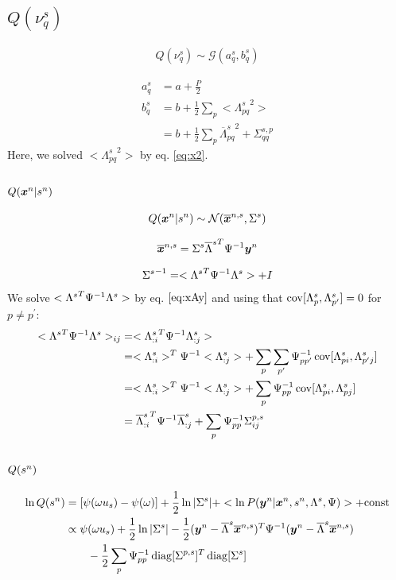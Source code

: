\documentclass[a4paper]{article}
\begin{document}
\subsection{$Q(\nu_q^s)$}
\begin{align}
 Q(\nu_q^s)\sim\mathcal{G}(a_q^s, b_q^s)
\end{align}

\begin{align}
a_q^s&=a+\frac{P}{2} \\
b_q^s&=b+\frac{1}{2}\sum_p<{\Lambda^s_{pq}}^2> \\
&=b+\frac{1}{2}\sum_p {\overline{\Lambda}_{pq}^s}^2+\Sigma_{qq}^{s,p}
\end{align}
Here, we solved $<{\Lambda^s_{pq}}^2>$ by eq. \ref{eq:x2}.

\subsection{$Q(\boldsymbol{x}^n|s^n)$}
\begin{align}
  Q(\boldsymbol{x}^n|s^n)\sim\mathcal{N}(\overline{\boldsymbol{x}}^{n,s},\Sigma^s)
\end{align}

\begin{align}
  \overline{\boldsymbol{x}}^{n,s}=\Sigma^s{\overline{\Lambda}^s}^T\Psi^{-1}\boldsymbol{y}^n
\end{align}

\begin{align}
  {\Sigma^s}^{-1}=<{\Lambda^s}^T \Psi^{-1} \Lambda^s>+I
\end{align}
We solve $<{\Lambda^s}^T \Psi^{-1} \Lambda^s>$ by eq. $\ref{eq:xAy}$ and using that $\operatorname{cov}[\Lambda^s_p,\Lambda^s_{p^\prime}]=0$ for $p\ne p^\prime$:
\begin{align}
  <{\Lambda^s}^T \Psi^{-1} \Lambda^s>_{ij}&=<{\Lambda^s_{:i}}^T \Psi^{-1} \Lambda^s_{:j}> \\
  &=<\Lambda^s_{:i}>^T\Psi^{-1} <\Lambda^s_{:j}>+\sum_p\sum_{p^\prime} \Psi^{-1}_{pp^\prime}\operatorname{cov}[\Lambda^s_{pi},\Lambda^s_{p^\prime j}] \\
  &=<\Lambda^s_{:i}>^T\Psi^{-1} <\Lambda^s_{:j}>+\sum_p \Psi^{-1}_{pp}\operatorname{cov}[\Lambda^s_{pi},\Lambda^s_{pj}] \\
  &={\overline{\Lambda}^s_{:i}}^T\Psi^{-1} \overline{\Lambda}^s_{:j}+\sum_p \Psi^{-1}_{pp}\Sigma^{p,s}_{ij}
\end{align}

\subsection{$Q(s^n)$}
\begin{align}
  \ln Q(s^n)
  &=\left[\psi(\omega u_s)-\psi(\omega)\right]+\frac{1}{2}\ln |\Sigma^s|+<\ln P(\boldsymbol{y}^n|\boldsymbol{x}^n,s^n,\Lambda^s,\Psi)>+\text{const} \\
  &\propto \psi(\omega u_s)+\frac{1}{2}\ln|\Sigma^s|-\frac{1}{2}(\boldsymbol{y}^n-\overline{\Lambda}^s\overline{\boldsymbol{x}}^{n,s})^T\Psi^{-1}(\boldsymbol{y}^n-\overline{\Lambda}^s\overline{\boldsymbol{x}}^{n,s}) \\
  &\qquad-\frac{1}{2}\sum_p \Psi^{-1}_{pp}\operatorname{diag}[\Sigma^{p,s}]^T\operatorname{diag}[\Sigma^s]
\end{align}
\end{document}
